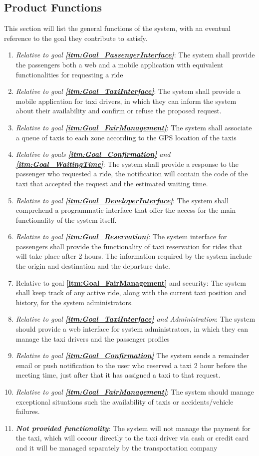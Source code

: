 \documentclass[11pt, a4paper,titlepage]{article}
\newcommand{\linkitm}[1]{\underline{\textbf{\ref{#1}}}}
\begin{document}
\subsection{Product Functions}
This section will list the general functions of the system, with an eventual reference to the goal they contribute to satisfy.
	\begin{enumerate}
		\item \textit{Relative to goal \linkitm{itm:Goal_PassengerInterface}}: The system shall provide the passengers both a web and a mobile application with equivalent functionalities for requesting a ride
		\item \textit{Relative to goal \linkitm{itm:Goal_TaxiInterface}}: The system shall provide a mobile application for taxi drivers, in which they can inform the system about their availability and confirm or refuse the proposed request.
		\item \textit{Relative to goal \linkitm{itm:Goal_FairManagement}}: The system shall associate a queue of taxis to each zone according to the GPS location of the taxis
		\item \textit{Relative to goals \linkitm{itm:Goal_Confirmation} and \linkitm{itm:Goal_WaitingTime}}: The system shall provide a response to the passenger who requested a ride, the notification will contain the code of the taxi that accepted the request and the estimated waiting time.
		\item \textit{Relative to goal \linkitm{itm:Goal_DeveloperInterface}}: The system shall comprehend a programmatic interface that offer the access for the main functionality of the system itself.
		\item \textit{Relative to goal \linkitm{itm:Goal_Reservation}}: The system interface for passengers shall provide the functionality of taxi reservation for rides that will take place after 2 hours. The information required by the system include the origin and destination and the departure date.
		\item {Relative to goal \linkitm{itm:Goal_FairManagement} and security}: The system shall keep track of any active ride, along with the current taxi position and history, for the system administrators.
		\item \textit{Relative to goal \linkitm{itm:Goal_TaxiInterface} and Administration}: The system should provide a web interface for system administrators, in which they can manage the taxi drivers and the passenger profiles
		\item \textit{Relative to goal \linkitm{itm:Goal_Confirmation}} The system sends a remainder email or push notification to the user who reserved a taxi 2 hour before the meeting time, just after that it has assigned a taxi to that request.
		\item \textit{Relative to goal \linkitm{itm:Goal_FairManagement}}: The system should manage exceptional situations such the availability of taxis or accidents/vehicle failures.
		\item \textit{\textbf{Not provided functionality}}: The system will not manage the payment for the taxi, which will occour directly to the taxi driver via cash or credit card and it will be managed separately by the transportation company
		
	\end{enumerate}
\end{document}
